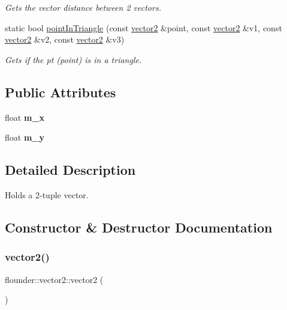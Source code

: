 \begin{DoxyCompactItemize}
\begin{DoxyCompactList}\small\item\em Gets the vector distance between 2 vectors. \end{DoxyCompactList}\item 
static bool \hyperlink{classflounder_1_1vector2_a99be81b66c5723b8a163046a07f55765}{point\+In\+Triangle} (const \hyperlink{classflounder_1_1vector2}{vector2} \&point, const \hyperlink{classflounder_1_1vector2}{vector2} \&v1, const \hyperlink{classflounder_1_1vector2}{vector2} \&v2, const \hyperlink{classflounder_1_1vector2}{vector2} \&v3)
\begin{DoxyCompactList}\small\item\em Gets if the pt (point) is in a triangle. \end{DoxyCompactList}\end{DoxyCompactItemize}
\subsection*{Public Attributes}
\begin{DoxyCompactItemize}
\item 
\mbox{\label{classflounder_1_1vector2_ade1354882caba909729c4cd9f0c82122}} 
float {\bfseries m\+\_\+x}
\item 
\mbox{\label{classflounder_1_1vector2_a119dff67aa09b4ed8f00c8d47b18a9b6}} 
float {\bfseries m\+\_\+y}
\end{DoxyCompactItemize}


\subsection{Detailed Description}
Holds a 2-\/tuple vector. 



\subsection{Constructor \& Destructor Documentation}
\mbox{\label{classflounder_1_1vector2_add30cfbc22d19411719748238464aa18}} 
\subsubsection{\texorpdfstring{vector2()}{vector2()}\hspace{0.1cm}{\footnotesize\ttfamily [1/3]}}
{\footnotesize\ttfamily flounder\+::vector2\+::vector2 (\begin{DoxyParamCaption}{ }\end{DoxyParamCaption})}



